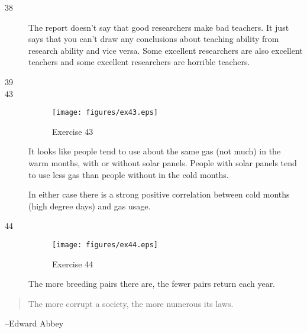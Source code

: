 \documentclass[letterpaper, landscape]{exam}
\begin{document}
\begin{description}

      \item[38]
        The report doesn't say that good researchers make bad teachers.  It just says that
        you can't draw any conclusions about teaching ability from research ability and
        vice versa.  Some excellent researchers are also excellent teachers and some
        excellent researchers are horrible teachers.

      \item[39]

      \item[43]
        \begin{figure}[H]
          \centering
          \texttt{[image: figures/ex43.eps]}
          \caption{Exercise 43}
        \end{figure}

        It looks like people tend to use about the same gas (not much) in the warm months,
        with or without solar panels.  People with solar panels tend to use less gas than
        people without in the cold months.

        In either case there is a strong positive correlation between cold months (high
        degree days) and gas usage.

      \item[44]
        \begin{figure}[H]
          \centering
          \texttt{[image: figures/ex44.eps]}
          \caption{Exercise 44}
        \end{figure}

        The more breeding pairs there are, the fewer pairs return each year.
    \end{description}


  \else
    \vspace{10 cm}
    \begin{quote}
      \begin{em}
        The more corrupt a society, the more numerous its laws.
      \end{em}
    \end{quote}
    \hspace{1 cm} --Edward Abbey
  \fi
\end{document}
